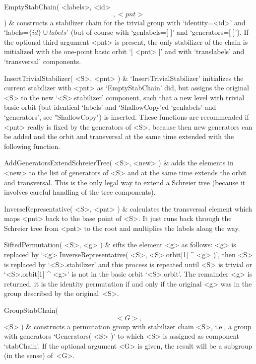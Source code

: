 \function EmptyStabChain( <labels>, <id> \[, <pnt> \] ) &
        constructs  a   stabilizer  chain  for   the trivial   group with
        `identity=<id>' and `labels=$\{id\}\cup  labels$'  (but of course
        with `genlabels=[ ]' and `generators=[ ]'). If the optional third
        argument <pnt>  is present, the only stabilizer   of the chain is
        initialized with the  one-point basic orbit  `[ <pnt> ]' and with
        `translabels' and `transversal' components.
        
\function InsertTrivialStabilizer( <S>, <pnt> ) &
        `InsertTrivialStabilizer' initializes the current stabilizer with
        <pnt> as `EmptyStabChain' did,   but assigns the original <S>  to
        the new `<S>.stabilizer'  component, such that  a new  level with
        trivial basic  orbit (but identical  `labels' and `ShallowCopy'ed
        `genlabels' and   `generators', see "ShallowCopy")  is  inserted.
        These functions are  recommended if <pnt> really  is fixed by the
        generators of  <S>, because then new  generators can be added and
        the  orbit  and transversal at  the same  time  extended with the
        following function.

\function AddGeneratorsExtendSchreierTree( <S>, <new> ) &
        adds the elements  in <new> to the list  of generators of <S> and
        at the  same time extends the  orbit and transversal. This is the
        only legal way  to extend  a  Schreier tree (because  it involves
        careful handling of the tree components).

\function InverseRepresentative( <S>, <pnt> ) &
        calculates the transversal element which  maps <pnt> back to  the
        base point of  <S>. It just  runs back through the  Schreier tree
        from <pnt> to the root and multiplies the labels along the way.

\function SiftedPermutation( <S>, <g> ) &
        sifts  the element  <g> as  follows: <g>  is replaced by  `<g> \*
        InverseRepresentative(  <S>, <S>.orbit[1] ^   <g> )', then <S> is
        replaced by `<S>.stabilizer' and  this process is repeated  until
        <S> is trivial or `<S>.orbit[1] ^ <g>' is  not in the basic orbit
        `<S>.orbit'.  The remainder <g>  is returned, it  is the identity
        permutation if  and  only if the  original <g>  was in  the group
        described by the original~<S>.

\function GroupStabChain( \[ <G>, \] <S> ) &
        constructs a permutation group with stabilizer chain <S>, i.e., a
        group    with  generators `Generators( <S>  )'   to  which <S> is
        assigned as component  `stabChain'. If the  optional argument <G>
        is  given, the result  will be  a subgroup (in  the {\GAP} sense)
        of~<G>.
\enditems

